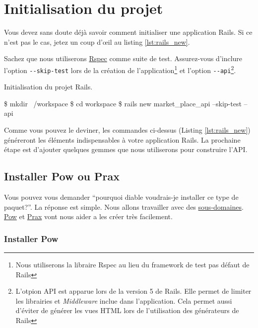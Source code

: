\documentclass[]{report}
\begin{document}
  \section{Initialisation du projet}

    Vous devez sans doute déjà savoir comment initialiser une application Rails. Si ce n'est pas le cas, jetez un coup d’œil au listing \ref{lst:rails_new}.

    Sachez que nous utiliserons \href{http://rspec.info/}{Rspec} comme suite de test. Assurez-vous d'inclure l'option \verb|--skip-test| lors de la création de l'application\footnote{Nous utiliserons la libraire Rspec au lieu du framework de test pas défaut de Rails} et l'option \verb|--api|\footnote{L'otpion API est apparue lors de la version 5 de Rails. Elle permet de limiter les librairies et \textit{Middleware} inclue dans l'application. Cela permet aussi d'éviter de générer les vues HTML lors de l'utilisation des générateurs de Rails}.

    \begin{listing}
      \caption{Initialisation du projet Rails.}
      \label{lst:rails_new}
      \begin{bashcode}
      \$ mkdir ~/workspace
      \$ cd workspace
      \$ rails new market_place_api --skip-test --api
      \end{bashcode}
    \end{listing}

    Comme vous pouvez le deviner, les commandes ci-dessus (Listing \ref{lst:rails_new}) généreront les éléments indispensables à votre application Rails. La prochaine étape est d'ajouter quelques gemmes que nous utiliserons pour construire l'API.

    \subsection{Installer Pow ou Prax}\label{subsection:install_pow}

      Vous pouvez vous demander \enquote{pourquoi diable voudrais-je installer ce type de paquet?}. La réponse est simple. Nous allons travailler avec des \href{http://en.wikipedia.org/wiki/Subdomain}{sous-domaines}. \href{http://pow.cx/}{Pow} et \href{https://github.com/ysbaddaden/prax.cr}{Prax} vont nous aider a les créer très facilement.

      \subsubsection{Installer Pow}
\end{document}
